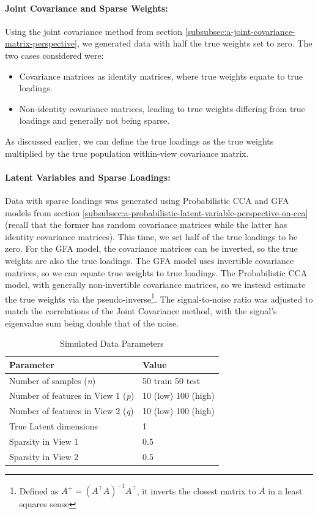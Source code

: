\paragraph{Joint Covariance and Sparse Weights:} Using the joint covariance method from section \ref{subsubsec:a-joint-covariance-matrix-perspective}, we generated data with half the true weights set to zero.
The two cases considered were:

\begin{itemize}
    \item Covariance matrices as identity matrices, where true weights equate to true loadings.
    \item Non-identity covariance matrices, leading to true weights differing from true loadings and generally not being sparse.
\end{itemize}

As discussed earlier, we can define the true loadings as the true weights multiplied by the true population within-view covariance matrix.

\paragraph{Latent Variables and Sparse Loadings:} Data with sparse loadings was generated using Probabilistic CCA and GFA models from section \ref{subsubsec:a-probabilistic-latent-variable-perspective-on-cca}(recall that the former has random covariance matrices while the latter has identity covariance matrices).
This time, we set half of the true loadings to be zero.
For the GFA model, the covariance matrices can be inverted, so the true weights are also the true loadings.
The GFA model uses invertible covariance matrices, so we can equate true weights to true loadings.
The Probabilistic CCA model, with generally non-invertible covariance matrices, so we instead estimate the true weights via the pseudo-inverse\footnote{Defined as $A^+ = (A^\top A)^{-1} A^\top$, it inverts the closest matrix to $A$ in a least squares sense}.
The signal-to-noise ratio was adjusted to match the correlations of the Joint Covariance method, with the signal's eigenvalue sum being double that of the noise.

\begin{table}[h]
\centering
\caption{Simulated Data Parameters}
\begin{tabular}{| l | l |}
\hline
\textbf{Parameter} & \textbf{Value} \\
\hline
Number of samples (\textit{n}) & 50 train 50 test \\
Number of features in View 1 (\textit{p}) & 10 (low) 100 (high) \\
Number of features in View 2 (\textit{q}) & 10 (low) 100 (high) \\
True Latent dimensions & 1 \\
Sparsity in View 1 & 0.5 \\
Sparsity in View 2 & 0.5 \\
\hline
\end{tabular}
\label{table:simulated-data-parameters}
\end{table}

